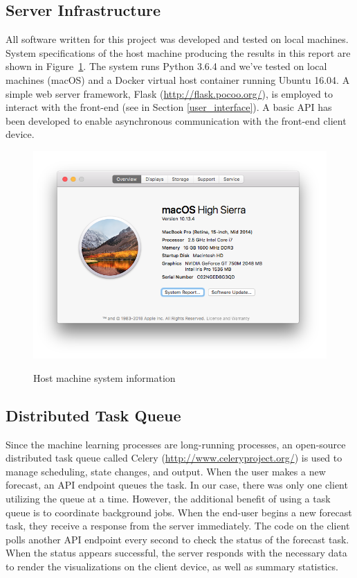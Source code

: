 \documentclass[11pt, oneside, authoryear]{report}
\begin{document}
\subsection{Server Infrastructure}
All software written for this project was developed and tested on local machines. System specifications of the host machine producing the results in this report are shown in Figure~\ref{fig:System_Specs}. The system runs Python 3.6.4 and we've tested on local machines (macOS) and a Docker virtual host container running Ubuntu 16.04. A simple web server framework, Flask (\url{http://flask.pocoo.org/}), is employed to interact with the front-end (see in Section \ref{user_interface}). A basic API has been developed to enable asynchronous communication with the front-end client device.

\begin{figure}[h]
  \caption{Host machine system information}
  \centering
  \includegraphics[width=12.5cm]{images/System_Specs.png}
  \label{fig:System_Specs}
\end{figure}

\subsection{Distributed Task Queue}
Since the machine learning processes are long-running processes, an open-source distributed task queue called Celery (\url{http://www.celeryproject.org/}) is used to manage scheduling, state changes, and output. When the user makes a new forecast, an API endpoint queues the task. In our case, there was only one client utilizing the queue at a time. However, the additional benefit of using a task queue is to coordinate background jobs. When the end-user begins a new forecast task, they receive a response from the server immediately. The code on the client polls another API endpoint every second to check the status of the forecast task. When the status appears successful, the server responds with the necessary data to render the visualizations on the client device, as well as summary statistics.
\end{document}
